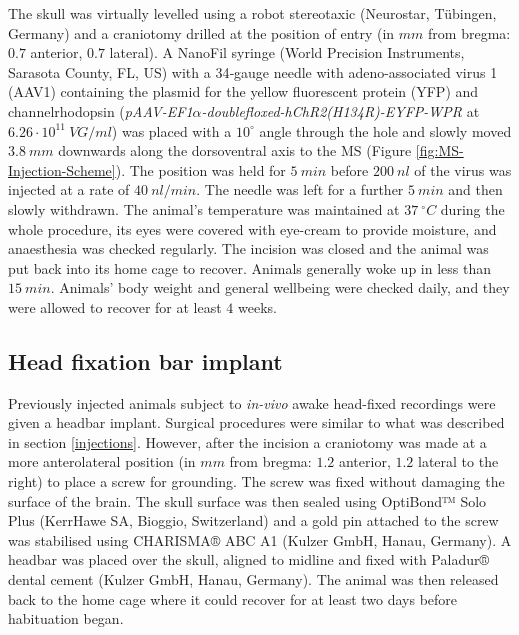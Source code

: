 \documentclass[
  12pt,
  a4paper,
  openany]{book}
\begin{document}
\noindent
The skull was virtually levelled using a robot stereotaxic (Neurostar, Tübingen, Germany) and a craniotomy drilled at the position of entry (in \(mm\) from bregma: \(0.7\) anterior, \(0.7\) lateral). A NanoFil syringe (World Precision Instruments, Sarasota County, FL, US) with a 34‐gauge needle with adeno-associated virus 1 (AAV1) containing the plasmid for the yellow fluorescent protein (YFP) and channelrhodopsin (\emph{pAAV-EF1}\(\alpha\)\emph{-doublefloxed-hChR2(H134R)-EYFP-WPR} at \(6.26\cdot 10^{11}\ VG/ml\)) was placed with a \(10^{\circ}\) angle through the hole and slowly moved \(3.8\ mm\) downwards along the dorsoventral axis to the MS (Figure \ref{fig:MS-Injection-Scheme}). The position was held for \(5\ min\) before \(200\ nl\) of the virus was injected at a rate of \(40\ nl/min\). The needle was left for a further \(5\ min\) and then slowly withdrawn. The animal's temperature was maintained at \(37\ ^{\circ}C\) during the whole procedure, its eyes were covered with eye-cream to provide moisture, and anaesthesia was checked regularly. The incision was closed and the animal was put back into its home cage to recover. Animals generally woke up in less than \(15\ min\). Animals' body weight and general wellbeing were checked daily, and they were allowed to recover for at least \(4\) weeks.

\hypertarget{head-fixation-bar-implant}{%
\subsection{Head fixation bar implant}\label{head-fixation-bar-implant}}

Previously injected animals subject to \emph{in-vivo} awake head-fixed recordings were given a headbar implant. Surgical procedures were similar to what was described in section \ref{injections}. However, after the incision a craniotomy was made at a more anterolateral position (in \(mm\) from bregma: \(1.2\) anterior, \(1.2\) lateral to the right) to place a screw for grounding. The screw was fixed without damaging the surface of the brain. The skull surface was then sealed using OptiBond™ Solo Plus (KerrHawe SA, Bioggio, Switzerland) and a gold pin attached to the screw was stabilised using CHARISMA® ABC A1 (Kulzer GmbH, Hanau, Germany). A headbar was placed over the skull, aligned to midline and fixed with Paladur® dental cement (Kulzer GmbH, Hanau, Germany). The animal was then released back to the home cage where it could recover for at least two days before habituation began.
\end{document}
